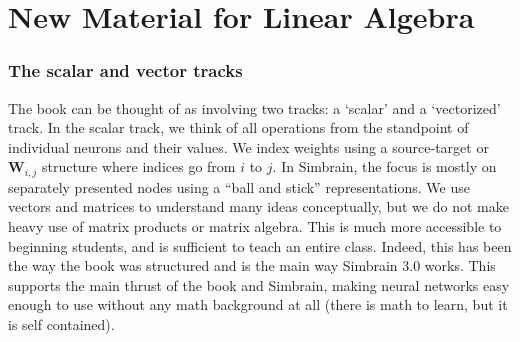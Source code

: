 \chapter{New Material for Linear Algebra}


\subsection{The scalar and vector tracks}\label{scalarVectorTracks}




The book can be thought of as involving two tracks: a `scalar' and a `vectorized' track. In the scalar track, we think of all operations from the standpoint of individual neurons and their values. We index weights using a source-target or $\textbf{W}_{i,j}$ structure where indices go from $i$ to $j$. In Simbrain, the focus is mostly on separately presented nodes using a ``ball and stick'' representations. We use vectors and matrices to understand many ideas conceptually, but we do not make heavy use of matrix products or matrix algebra. This is much more accessible to beginning students, and is sufficient to teach an entire class. Indeed, this has been the way the book was structured and is the main way Simbrain 3.0 works. This supports the main thrust of the book and Simbrain, making neural networks easy enough to use without any math background at all (there is math to learn, but it is self contained). 

